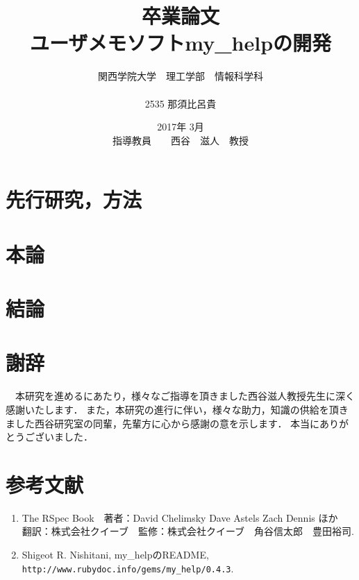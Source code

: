 \documentclass[12pt,a4paper]{jsarticle}
\begin{document}
\title{卒業論文\\
\vspace{4cm} ユーザメモソフトmy\_helpの開発}
\author{ 関西学院大学　理工学部　情報科学科\\\\2535 那須比呂貴}
\date{\vspace{3cm} 2017年  3月\\
\vspace{3cm} 指導教員　　西谷　滋人　教授}
\maketitle
\setcounter{tocdepth}{4}
\tableofcontents

\tableofcontents


\section{先行研究，方法}



\section{本論}



\section{結論}
\section{謝辞}
　本研究を進めるにあたり，様々なご指導を頂きました西谷滋人教授先生に深く感謝いたします．
また，本研究の進行に伴い，様々な助力，知識の供給を頂きました西谷研究室の同輩，先輩方に心から感謝の意を示します．
本当にありがとうございました．

\section{参考文献}
\begin{enumerate}
\item The RSpec Book　著者：David Chelimsky Dave Astels Zach Dennis ほか　翻訳：株式会社クイーブ　監修：株式会社クイーブ　角谷信太郎　豊田裕司.
\item Shigeot R. Nishitani, my\_helpのREADME, \verb|http://www.rubydoc.info/gems/my_help/0.4.3|.
\end{enumerate}
\end{document}

